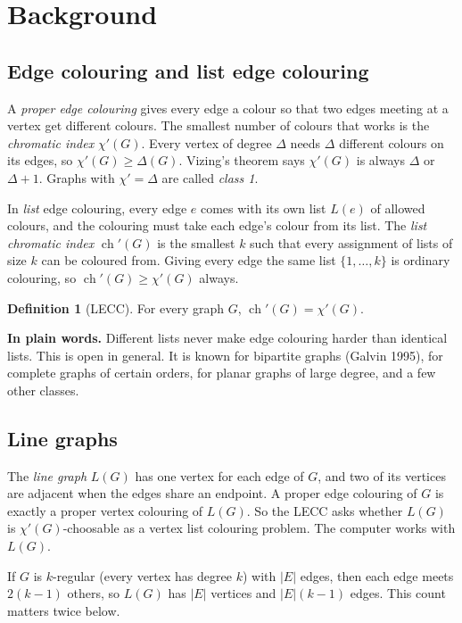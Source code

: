 \documentclass[11pt]{article}
\theoremstyle{plain}
\theoremstyle{definition}
\newtheorem{definition}[theorem]{Definition}
\newcommand{\ch}{\operatorname{ch}}
\newcommand{\plain}[1]{\par\smallskip\noindent\colorbox{black!6}{\parbox{\dimexpr\linewidth-2\fboxsep}{\small\textbf{In plain words.} #1}}\par\smallskip}
\begin{document}
\section{Background}

\subsection{Edge colouring and list edge colouring}

A \emph{proper edge colouring} gives every edge a colour so that two edges meeting at a vertex
get different colours. The smallest number of colours that works is the \emph{chromatic index}
$\chi'(G)$. Every vertex of degree $\Delta$ needs $\Delta$ different colours on its edges, so
$\chi'(G) \ge \Delta(G)$. Vizing's theorem says $\chi'(G)$ is always $\Delta$ or $\Delta+1$.
Graphs with $\chi' = \Delta$ are called \emph{class 1}.

In \emph{list} edge colouring, every edge $e$ comes with its own list $L(e)$ of allowed colours,
and the colouring must take each edge's colour from its list. The \emph{list chromatic index}
$\ch'(G)$ is the smallest $k$ such that every assignment of lists of size $k$ can be coloured
from. Giving every edge the same list $\{1,\dots,k\}$ is ordinary colouring, so
$\ch'(G) \ge \chi'(G)$ always.

\begin{definition}[LECC]
For every graph $G$, $\ch'(G) = \chi'(G)$.
\end{definition}

\plain{Different lists never make edge colouring harder than identical lists. This is open in
general. It is known for bipartite graphs (Galvin 1995), for complete graphs of certain orders,
for planar graphs of large degree, and a few other classes.}

\subsection{Line graphs}

The \emph{line graph} $L(G)$ has one vertex for each edge of $G$, and two of its vertices are
adjacent when the edges share an endpoint. A proper edge colouring of $G$ is exactly a proper
vertex colouring of $L(G)$. So the LECC asks whether $L(G)$ is $\chi'(G)$-choosable as a vertex
list colouring problem. The computer works with $L(G)$.

If $G$ is $k$-regular (every vertex has degree $k$) with $|E|$ edges, then each edge meets
$2(k-1)$ others, so $L(G)$ has $|E|$ vertices and $|E|(k-1)$ edges. This count matters twice
below.
\end{document}
